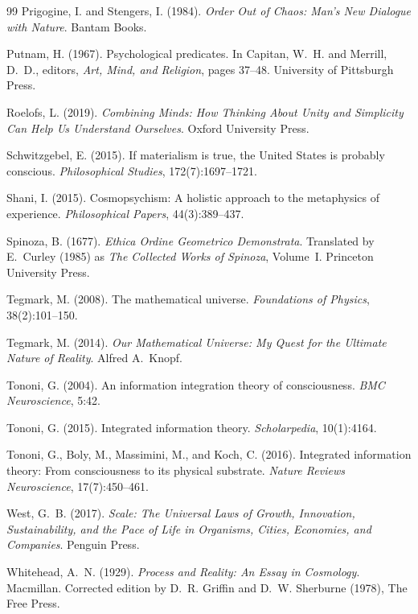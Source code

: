 \documentclass[12pt,a4paper]{article}
\begin{document}
\begin{thebibliography}{99}
Prigogine, I. and Stengers, I. (1984).
\newblock \emph{Order Out of Chaos: Man's New Dialogue with Nature}.
\newblock Bantam Books.

Putnam, H. (1967).
\newblock Psychological predicates.
\newblock In Capitan, W.~H. and Merrill, D.~D., editors, \emph{Art, Mind,
  and Religion}, pages 37--48. University of Pittsburgh Press.

Roelofs, L. (2019).
\newblock \emph{Combining Minds: How Thinking About Unity and Simplicity
  Can Help Us Understand Ourselves}.
\newblock Oxford University Press.

Schwitzgebel, E. (2015).
\newblock If materialism is true, the United States is probably conscious.
\newblock \emph{Philosophical Studies}, 172(7):1697--1721.

Shani, I. (2015).
\newblock Cosmopsychism: A holistic approach to the metaphysics of
  experience.
\newblock \emph{Philosophical Papers}, 44(3):389--437.

Spinoza, B. (1677).
\newblock \emph{Ethica Ordine Geometrico Demonstrata}.
\newblock Translated by E.~Curley (1985) as \emph{The Collected Works of
  Spinoza}, Volume~I. Princeton University Press.

Tegmark, M. (2008).
\newblock The mathematical universe.
\newblock \emph{Foundations of Physics}, 38(2):101--150.

Tegmark, M. (2014).
\newblock \emph{Our Mathematical Universe: My Quest for the Ultimate
  Nature of Reality}.
\newblock Alfred A.~Knopf.

Tononi, G. (2004).
\newblock An information integration theory of consciousness.
\newblock \emph{BMC Neuroscience}, 5:42.

Tononi, G. (2015).
\newblock Integrated information theory.
\newblock \emph{Scholarpedia}, 10(1):4164.

Tononi, G., Boly, M., Massimini, M., and Koch, C. (2016).
\newblock Integrated information theory: From consciousness to its
  physical substrate.
\newblock \emph{Nature Reviews Neuroscience}, 17(7):450--461.

West, G.~B. (2017).
\newblock \emph{Scale: The Universal Laws of Growth, Innovation,
  Sustainability, and the Pace of Life in Organisms, Cities, Economies,
  and Companies}.
\newblock Penguin Press.

Whitehead, A.~N. (1929).
\newblock \emph{Process and Reality: An Essay in Cosmology}.
\newblock Macmillan. Corrected edition by D.~R. Griffin and D.~W.
  Sherburne (1978), The Free Press.

\end{thebibliography}
\end{document}
